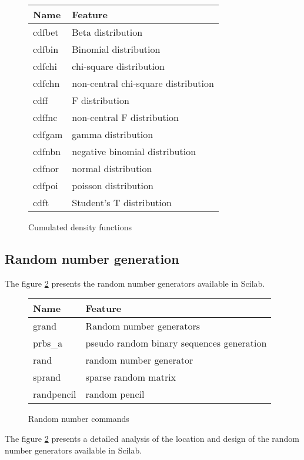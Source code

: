 \begin{figure}[htbp]
\begin{tabular}{|l|l|}
\hline
Name & Feature\\
\hline
cdfbet & Beta distribution \\
cdfbin & Binomial distribution \\
cdfchi & chi-square distribution \\
cdfchn & non-central chi-square distribution \\
cdff & F distribution \\
cdffnc & non-central F distribution \\
cdfgam & gamma distribution \\
cdfnbn & negative binomial distribution \\
cdfnor & normal distribution \\
cdfpoi & poisson distribution \\
cdft & Student's T distribution\\
\hline
\end{tabular}
\caption{Cumulated density functions}
\label{inscilab-cdffunctions}
\end{figure}


\subsection{Random number generation}

The figure \ref{inscilab-randomnumbercommands} presents the random
number generators available in Scilab.

\begin{figure}[htbp]
\begin{tabular}{|l|l|}
\hline
Name & Feature\\
\hline
grand & Random number generators \\
prbs\_a & pseudo random binary sequences generation \\
rand & random number generator \\
sprand & sparse random matrix \\
randpencil & random pencil \\
\hline
\end{tabular}
\caption{Random number commands}
\label{inscilab-randomnumbercommands}
\end{figure}

The figure \ref{inscilab-randomnumbercommands} presents a detailed 
analysis of the location and design of the random
number generators available in Scilab.

